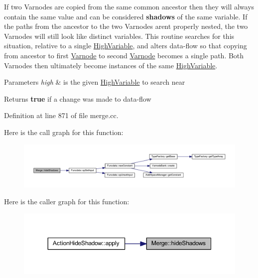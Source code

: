 If two Varnodes are copied from the same common ancestor then they will always contain the same value and can be considered {\bfseries{shadows}} of the same variable. If the paths from the ancestor to the two Varnodes aren\textquotesingle{}t properly nested, the two Varnodes will still look like distinct variables. This routine searches for this situation, relative to a single \mbox{\hyperlink{class_high_variable}{High\+Variable}}, and alters data-\/flow so that copying from ancestor to first \mbox{\hyperlink{class_varnode}{Varnode}} to second \mbox{\hyperlink{class_varnode}{Varnode}} becomes a single path. Both Varnodes then ultimately become instances of the same \mbox{\hyperlink{class_high_variable}{High\+Variable}}. 
\begin{DoxyParams}{Parameters}
{\em high} & is the given \mbox{\hyperlink{class_high_variable}{High\+Variable}} to search near \\
\hline
\end{DoxyParams}
\begin{DoxyReturn}{Returns}
{\bfseries{true}} if a change was made to data-\/flow 
\end{DoxyReturn}


Definition at line 871 of file merge.\+cc.

Here is the call graph for this function\+:
\nopagebreak
\begin{figure}[H]
\begin{center}
\leavevmode
\includegraphics[width=350pt]{class_merge_abb1f01b80297db3a5c37c9860af56162_cgraph}
\end{center}
\end{figure}
Here is the caller graph for this function\+:
\nopagebreak
\begin{figure}[H]
\begin{center}
\leavevmode
\includegraphics[width=350pt]{class_merge_abb1f01b80297db3a5c37c9860af56162_icgraph}
\end{center}
\end{figure}
\mbox{\label{class_merge_a157b6a6d44e6aec22f1bb77201f3e402}} 
